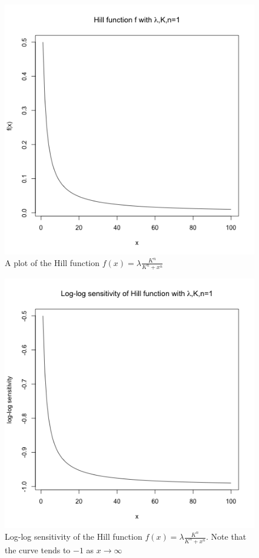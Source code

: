 \documentclass[a4paper,12pt]{article}
\begin{document}
\begin{figure}
\centering
\includegraphics[width=5in]{images/hill.png}
\caption{A plot of the Hill function $f(x) = \lambda \frac{K^n}{K^n+x^n}$}
\label{hill}
\end{figure}

\begin{figure}
\centering
\includegraphics[width=5in]{images/log-log.png}
\caption{Log-log sensitivity of the Hill function $f(x) = \lambda \frac{K^n}{K^n+x^n}$. Note that the curve tends to $-1$ as $x\longrightarrow \infty$}
\label{log-log}
\end{figure}
\end{document}
